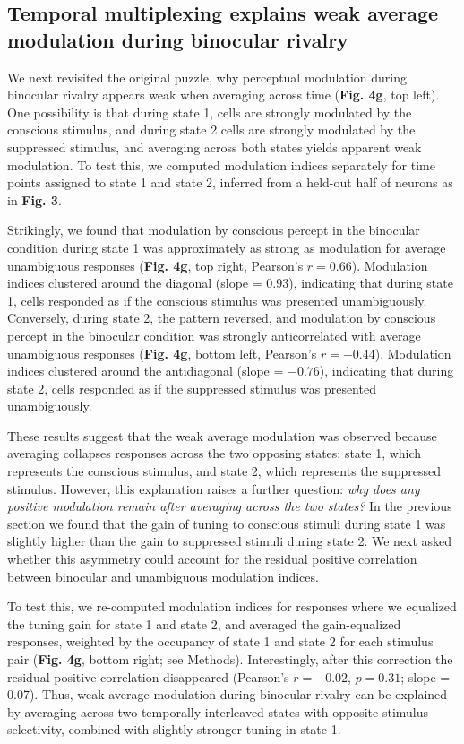 \documentclass{article}
\begin{document}
\subsection*{Temporal multiplexing explains weak average modulation during binocular rivalry}

We next revisited the original puzzle, why perceptual modulation during binocular rivalry appears weak when averaging across time (\textbf{Fig. 4g}, top left). One possibility is that during state 1, cells are strongly modulated by the conscious stimulus, and during state 2 cells are strongly modulated by the suppressed stimulus, and averaging across both states yields apparent weak modulation. To test this, we computed modulation indices separately for time points assigned to state 1 and state 2, inferred from a held-out half of neurons as in \textbf{Fig. 3}.

Strikingly, we found that modulation by conscious percept in the binocular condition during state 1 was approximately as strong as modulation for average unambiguous responses (\textbf{Fig. 4g}, top right, Pearson's $r = 0.66$). Modulation indices clustered around the diagonal (slope = 0.93), indicating that during state 1, cells responded as if the conscious stimulus was presented unambiguously. Conversely, during state 2, the pattern reversed, and modulation by conscious percept in the binocular condition was strongly anticorrelated with average unambiguous responses (\textbf{Fig. 4g}, bottom left, Pearson's $r = -0.44$). Modulation indices clustered around the antidiagonal (slope = $-0.76$), indicating that during state 2, cells responded as if the suppressed stimulus was presented unambiguously.

These results suggest that the weak average modulation was observed because averaging collapses responses across the two opposing states: state 1, which represents the conscious stimulus, and state 2, which represents the suppressed stimulus. However, this explanation raises a further question: \textit{why does any positive modulation remain after averaging across the two states?} In the previous section we found that the gain of tuning to conscious stimuli during state 1 was slightly higher than the gain to suppressed stimuli during state 2. We next asked whether this asymmetry could account for the residual positive correlation between binocular and unambiguous modulation indices.

To test this, we re-computed modulation indices for responses where we equalized the tuning gain for state 1 and state 2, and averaged the gain-equalized responses, weighted by the occupancy of state 1 and state 2 for each stimulus pair (\textbf{Fig. 4g}, bottom right; see Methods). Interestingly, after this correction the residual positive correlation disappeared (Pearson's $r = -0.02$, $p = 0.31$; slope = 0.07). Thus, weak average modulation during binocular rivalry can be explained by averaging across two temporally interleaved states with opposite stimulus selectivity, combined with slightly stronger tuning in state 1.
\end{document}
